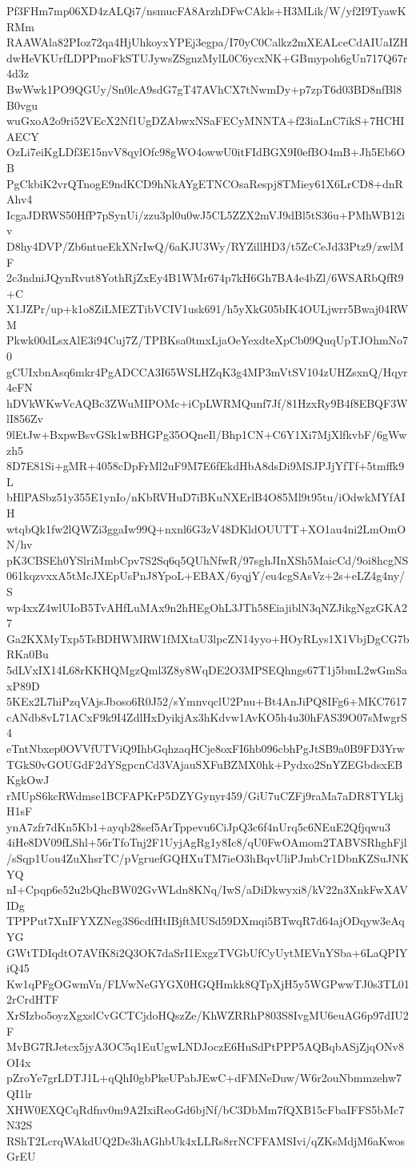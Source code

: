 Pf3FHm7mp06XD4zALQi7/nsmucFA8ArzhDFwCAkls+H3MLik/W/yf2I9TyawKRMm
RAAWAla82PIoz72qa4HjUhkoyxYPEj3egpa/I70yC0Calkz2mXEALceCdAIUaIZH
dwHeVKUrfLDPPmoFkSTUJywsZSgnzMylL0C6ycxNK+GBmypoh6gUn717Q67r4d3z
BwWwk1PO9QGUy/Sn0lcA9sdG7gT47AVhCX7tNwmDy+p7zpT6d03BD8nfBl8B0vgu
wuGxoA2o9ri52VEcX2Nf1UgDZAbwxNSaFECyMNNTA+f23iaLnC7ikS+7HCHIAECY
OzLi7eiKgLDf3E15nvV8qylOfc98gWO4owwU0itFIdBGX9I0efBO4mB+Jh5Eb6OB
PgCkbiK2vrQTnogE9ndKCD9hNkAYgETNCOsaRespj8TMiey61X6LrCD8+dnRAhv4
IcgaJDRWS50HfP7pSynUi/zzu3pl0u0wJ5CL5ZZX2mVJ9dBl5tS36u+PMhWB12iv
D8hy4DVP/Zb6ntueEkXNrIwQ/6aKJU3Wy/RYZillHD3/t5ZcCeJd33Ptz9/zwlMF
2c3ndniJQynRvut8YothRjZxEy4B1WMr674p7kH6Gh7BA4e4bZl/6WSARbQfR9+C
X1JZPr/up+k1o8ZiLMEZTibVCIV1usk691/h5yXkG05bIK4OULjwrr5Bwaj04RWM
Pkwk00dLsxAlE3i94Cuj7Z/TPBKsa0tmxLjaOeYexdteXpCb09QuqUpTJOhmNo70
gCUIxbnAsq6mkr4PgADCCA3I65WSLHZqK3g4MP3mVtSV104zUHZsxnQ/Hqyr4eFN
hDVkWKwVcAQBc3ZWuMIPOMc+iCpLWRMQunf7Jf/81HzxRy9B4f8EBQF3WlI856Zv
9lEtJw+BxpwBsvGSk1wBHGPg35OQneIl/Bhp1CN+C6Y1Xi7MjXlfkvbF/6gWwzh5
8D7E81Si+gMR+4058cDpFrMl2uF9M7E6fEkdHbA8dsDi9MSJPJjYfTf+5tmffk9L
bHlPASbz51y355E1ynIo/nKbRVHuD7iBKuNXErlB4O85Ml9t95tu/iOdwkMYfAIH
wtqbQk1fw2lQWZi3ggaIw99Q+nxnl6G3zV48DKldOUUTT+XO1au4ni2LmOmON/hv
pK3CBSEh0YSlriMmbCpv7S2Sq6q5QUhNfwR/97sghJInXSh5MaicCd/9oi8hcgNS
061kqzvxxA5tMcJXEpUsPnJ8YpoL+EBAX/6yqjY/eu4cgSAsVz+2s+eLZ4g4ny/S
wp4xxZ4wlUIoB5TvAHfLuMAx9n2hHEgOhL3JTh58EiajiblN3qNZJikgNgzGKA27
Ga2KXMyTxp5TsBDHWMRW1fMXtaU3lpcZN14yyo+HOyRLys1X1VbjDgCG7bRKa0Bu
5dLVxIX14L68rKKHQMgzQml3Z8y8WqDE2O3MPSEQhngs67T1j5bmL2wGmSaxP89D
5KEx2L7hiPzqVAjsJboso6R0J52/sYmnvqclU2Pnu+Bt4AnJiPQ8IFg6+MKC7617
cANdb8vL71ACxF9k9I4ZdlHxDyikjAx3hKdvw1AvKO5h4u30hFAS39O07sMwgrS4
eTntNbxep0OVVfUTViQ9IhbGqhzaqHCje8oxFI6hb096cbhPgJtSB9a0B9FD3Yrw
TGkS0vGOUGdF2dYSgpcnCd3VAjauSXFuBZMX0hk+Pydxo2SnYZEGbdsxEBKgkOwJ
rMUpS6kcRWdmse1BCFAPKrP5DZYGynyr459/GiU7uCZFj9raMa7aDR8TYLkjH1sF
ynA7zfr7dKn5Kb1+ayqb28sef5ArTppevu6CiJpQ3c6f4nUrq5c6NEuE2Qfjqwu3
4iHe8DV09fLShl+56rTfoTnj2F1UyjAgRg1y8Ic8/qU0FwOAmom2TABVSRhghFjl
/sSqp1Uou4ZuXhsrTC/pVgruefGQHXuTM7ieO3hBqvUliPJmbCr1DbnKZSuJNKYQ
nI+Cpqp6e52u2bQhcBW02GvWLdn8KNq/IwS/aDiDkwyxi8/kV22n3XnkFwXAVIDg
TPPPut7XnIFYXZNeg3S6cdfHtIBjftMUSd59DXmqi5BTwqR7d64ajODqyw3eAqYG
GWtTDIqdtO7AVfK8i2Q3OK7daSrI1ExgzTVGbUfCyUytMEVnYSba+6LaQPIYiQ45
Kw1qPFgOGwmVn/FLVwNeGYGX0HGQHmkk8QTpXjH5y5WGPwwTJ0s3TL012rCrdHTF
XrSIzbo5oyzXgxslCvGCTCjdoHQszZe/KhWZRRhP803S8IvgMU6euAG6p97dIU2F
MvBG7RJetcx5jyA3OC5q1EuUgwLNDJoczE6HuSdPtPPP5AQBqbASjZjqONv8OI4x
pZroYe7grLDTJ1L+qQhI0gbPkeUPabJEwC+dFMNeDuw/W6r2ouNbmmzehw7QI1lr
XHW0EXQCqRdfnv0m9A2IxiReoGd6bjNf/bC3DbMm7fQXB15cFbaIFFS5bMc7N32S
RShT2LcrqWAkdUQ2De3hAGhbUk4xLLRs8rrNCFFAMSIvi/qZKsMdjM6aKwosGrEU

